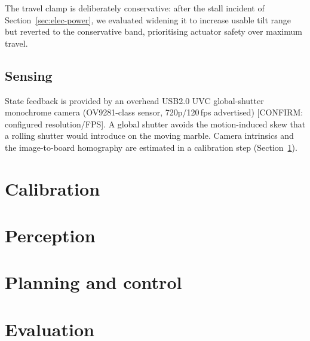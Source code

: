The travel clamp is deliberately conservative: after the stall incident of
Section~\ref{sec:elec-power}, we evaluated widening it to increase usable tilt
range but reverted to the conservative band, prioritising actuator safety over
maximum travel.

\subsection{Sensing}
\label{sec:elec-sensing}

State feedback is provided by an overhead USB2.0 UVC global-shutter monochrome
camera (OV9281-class sensor, 720p/120\,fps advertised) [CONFIRM: configured
resolution/FPS]. A global shutter avoids the motion-induced skew that a rolling
shutter would introduce on the moving marble. Camera intrinsics and the
image-to-board homography are estimated in a calibration step
(Section~\ref{sec:calibration}).


\section{Calibration}
\label{sec:calibration}

\section{Perception}
\label{sec:perception}

\section{Planning and control}
\label{sec:control}

\section{Evaluation}
\label{sec:evaluation}

